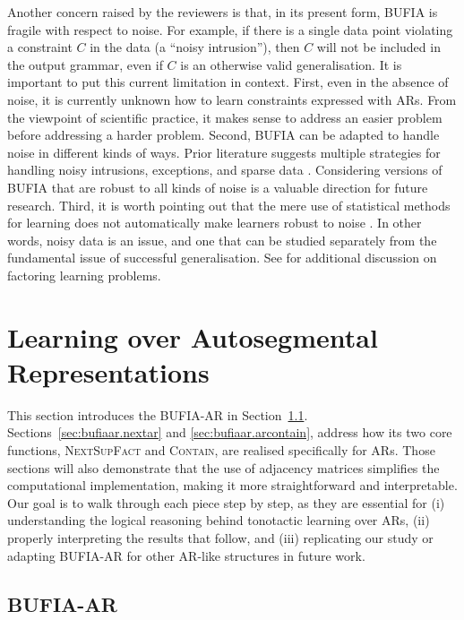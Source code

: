 Another concern raised by the reviewers is that, in its
present form, BUFIA is fragile with respect to noise. For example, if
there is a single data point violating a constraint \(C\) in the
data (a ``noisy intrusion''), then \(C\) will not be included in the
output grammar, even if \(C\) is an otherwise valid
generalisation. It is important to put this current limitation in
context. First, even in the absence of noise, it is currently unknown
how to learn constraints expressed with ARs. From the viewpoint of
scientific practice, it makes sense to address an easier problem
before addressing a harder problem. Second, BUFIA can be adapted to
handle noise in different kinds of ways. Prior literature suggests
multiple strategies for handling noisy intrusions, exceptions, and
sparse data \citep{angluin88, Yang2016, Wu-Heinz-2023-SELDNI,
  Kaelbling+2023-RILIPD, Dai2025}. Considering versions of BUFIA that
are robust to all kinds of noise is a valuable direction for future
research. Third, it is worth pointing out that the mere use of
statistical methods for learning does not automatically make learners
robust to noise \citep{Angluin88b}. In other words, noisy data is an
issue, and one that can be studied separately from the fundamental
issue of successful generalisation. See \citet{Heinz2009} for
additional discussion on factoring learning problems.

\section{Learning over Autosegmental Representations} \label{sec:bufiaar}

This section introduces the BUFIA-AR in Section~\ref{sec:bufiaar.algo}.
Sections~\ref{sec:bufiaar.nextar} and \ref{sec:bufiaar.arcontain}, 
address how its two core functions, \textsc{NextSupFact} and 
\textsc{Contain}, are realised specifically for ARs.  Those sections will also demonstrate that the
use of adjacency matrices simplifies the computational implementation,
making it more straightforward and interpretable. Our goal is to walk
through each piece step by step, as they are essential for (i)
understanding the logical reasoning behind tonotactic learning over
ARs, (ii) properly interpreting the results that follow, and (iii)
replicating our study or adapting BUFIA-AR for other AR-like structures in future work.

\subsection{BUFIA-AR} \label{sec:bufiaar.algo}

